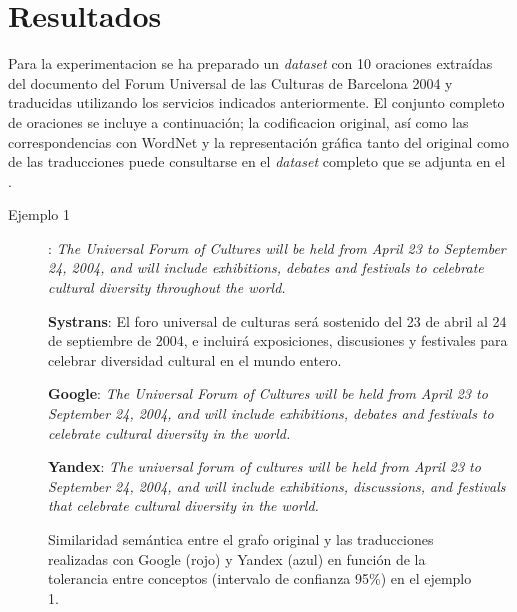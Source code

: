 \documentclass[a4paper,12pt,spanish]{book}
\begin{document}
\section{Resultados}
\label{5.pruebas/index:resultados}
Para la experimentacion se ha preparado un \emph{dataset} con 10 oraciones extraídas del
documento del Forum Universal de las Culturas de Barcelona 2004 y traducidas utilizando
los servicios indicados anteriormente. El conjunto completo de oraciones se incluye a
continuación; la codificacion original, así como las correspondencias con WordNet y
la representación gráfica tanto del original como de las traducciones puede
consultarse en el \emph{dataset} completo que se adjunta en el {\hyperref[appendix-data:appendix-data]{\emph{}}}.
\begin{description}
\item[{Ejemplo 1}] \leavevmode
: \emph{The Universal Forum of Cultures will be held from April 23 to September 24, 2004, and will include exhibitions, debates and festivals to celebrate cultural diversity throughout the world.}

\textbf{Systrans}: El foro universal de culturas será sostenido del 23 de abril al 24 de septiembre de 2004, e incluirá exposiciones, discusiones y festivales para celebrar diversidad cultural en el mundo entero.

\textbf{Google}: \emph{The Universal Forum of Cultures will be held from April 23 to September 24, 2004, and will include exhibitions, debates and festivals to celebrate cultural diversity in the world.}

\textbf{Yandex}: \emph{The universal forum of cultures will be held from April 23 to September 24, 2004, and will include exhibitions, discussions, and festivals that celebrate cultural diversity in the world.}

\end{description}
\begin{figure}[htbp]
\centering
\capstart

\caption{Similaridad semántica entre el grafo original y las traducciones realizadas con Google (rojo) y Yandex (azul) en función de la tolerancia entre conceptos (intervalo de confianza 95\%) en el ejemplo 1.}\label{5.pruebas/index:sample01-relation-tol-0}\end{figure}
\end{document}
